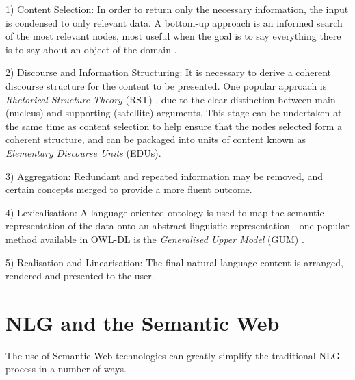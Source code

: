 \documentclass{acm_proc_article-sp}
\begin{document}
1) Content Selection: In order to return only the necessary information, the input is condensed to only relevant data. A bottom-up approach is an informed search of the most relevant nodes, most useful when the goal is to say everything there is to say about an object of the domain \cite{22}.

2) Discourse and Information Structuring: It is necessary to derive a coherent discourse structure for the content to be presented. One popular approach is \textit{Rhetorical Structure Theory} (RST) \cite{82}, due to the clear distinction between main (nucleus) and supporting (satellite) arguments. This stage can be undertaken at the same time as content selection to help ensure that the nodes selected form a coherent structure, and can be packaged into units of content known as \textit{Elementary Discourse Units} (EDUs)\cite{35}.

3) Aggregation: Redundant and repeated information may be removed, and certain concepts merged to provide a more fluent outcome.

4) Lexicalisation: A language-oriented ontology is used to map the semantic representation of the data onto an abstract linguistic representation - one popular method available in OWL-DL is the \textit{Generalised Upper Model} (GUM) \cite{10}.

5) Realisation and Linearisation: The final natural language content is arranged, rendered and presented to the user.

\section{NLG and the Semantic Web}
The use of Semantic Web technologies can greatly simplify the traditional NLG process in a number of ways.
\end{document}

